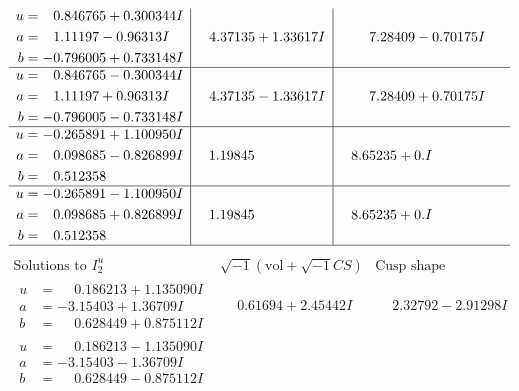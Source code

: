 \documentclass[1p]{elsarticle_modified}
\theoremstyle{definition}
\newcommand{\I}{\sqrt{-1}}
\begin{document}
$$\begin{array}{c|c|c}
\begin{aligned}
u &= \phantom{-}0.846765 + 0.300344 I \\
a &= \phantom{-}1.11197 - 0.96313 I \\
b &= -0.796005 + 0.733148 I\end{aligned}
 & \phantom{-}4.37135 + 1.33617 I & \phantom{-}7.28409 - 0.70175 I \\ \hline\begin{aligned}
u &= \phantom{-}0.846765 - 0.300344 I \\
a &= \phantom{-}1.11197 + 0.96313 I \\
b &= -0.796005 - 0.733148 I\end{aligned}
 & \phantom{-}4.37135 - 1.33617 I & \phantom{-}7.28409 + 0.70175 I \\ \hline\begin{aligned}
u &= -0.265891 + 1.100950 I \\
a &= \phantom{-}0.098685 - 0.826899 I \\
b &= \phantom{-}0.512358\phantom{ +0.000000I}\end{aligned}
 & \phantom{-}1.19845\phantom{ +0.000000I} & \phantom{-}8.65235 + 0. I\phantom{ +0.000000I} \\ \hline\begin{aligned}
u &= -0.265891 - 1.100950 I \\
a &= \phantom{-}0.098685 + 0.826899 I \\
b &= \phantom{-}0.512358\phantom{ +0.000000I}\end{aligned}
 & \phantom{-}1.19845\phantom{ +0.000000I} & \phantom{-}8.65235 + 0. I\phantom{ +0.000000I}\\
 \hline 
 \end{array}$$\newpage$$\begin{array}{c|c|c}  
\text{Solutions to }I^u_{2}& \I (\text{vol} + \sqrt{-1}CS) & \text{Cusp shape}\\
 \hline 
\begin{aligned}
u &= \phantom{-}0.186213 + 1.135090 I \\
a &= -3.15403 + 1.36709 I \\
b &= \phantom{-}0.628449 + 0.875112 I\end{aligned}
 & \phantom{-}0.61694 + 2.45442 I & \phantom{-}2.32792 - 2.91298 I \\ \hline\begin{aligned}
u &= \phantom{-}0.186213 - 1.135090 I \\
a &= -3.15403 - 1.36709 I \\
b &= \phantom{-}0.628449 - 0.875112 I\end{aligned}

\end{array}$$
\end{document}
